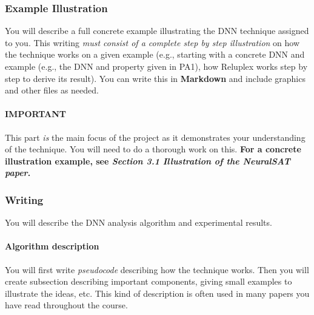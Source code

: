 \documentclass[11pt]{article}
\begin{document}
\subsubsection{Example Illustration}
\label{sec:orga9923fc}
You will describe a full concrete example illustrating the DNN technique assigned to you. %
This writing \emph{must consist of a complete step by step illustration} on how the technique works on a given example (e.g., starting with a concrete DNN and example (e.g., the DNN and property given in PA1), how Reluplex works step by step to derive its result).
You can write this in \textbf{Markdown} and include graphics and other files as needed.

\paragraph{IMPORTANT} This part \emph{is} the main focus of the project as it demonstrates your understanding of the technique. You will need to do a thorough work on this.  \textbf{For a concrete illustration example, see \emph{Section 3.1 Illustration of the NeuralSAT paper}.}



\subsubsection{Writing}
You will describe the DNN analysis algorithm and experimental results.

\paragraph{Algorithm description} You will first write \emph{pseudocode} describing how the technique works.  Then you will create subsection describing important components, giving small examples to illustrate the ideas, etc.  This kind of description is often used in many papers you have read throughout the course.  
\end{document}
